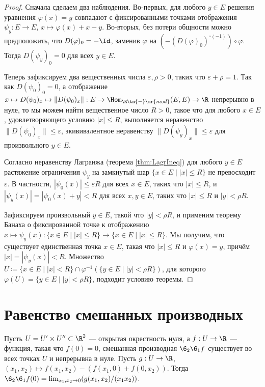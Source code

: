 \documentclass[
	extrafontsizes,
	11pt,
	hyphens,
]{memoir}
\begin{document}
\begin{proof}
Сначала сделаем два наблюдения.
Во-первых, для любого \(y \in E\) решения уравнения \(\varphi(x) = y\) совпадают с фиксированными точками отображения \(\psi_y : E \to E\), \(x \mapsto \varphi(x) + x - y\).
Во-вторых,
без потери общности
можно предположить, что
\(D(\varphi)_0 = -\Id\),
заменив \(\varphi\) на \((-(D(\varphi)_0)^{\circ(-1)}) \circ \varphi\).
Тогда \(D(\psi_y)_0 = 0\) для всех \(y \in E\).

Теперь зафиксируем два вещественных числа
\(\varepsilon, \rho > 0\), таких что \(\varepsilon + \rho = 1\).
Так как \(D(\psi_0)_0 = 0\),
а отображение
\(x \mapsto D(\psi_0)_x \mapsto \lVert D(\psi_0)_x \rVert : E \to \Hom_{\R\tn{-}\mr{mod}}(E,E) \to \R\)
непрерывно в нуле, то 
мы можем найти вещественное число \(R > 0\), такое что
для любого \(x \in E\), удовлетворяющего условию \(|x| \leq R\), выполняется неравенство \(\lVert D(\psi_0)_x \rVert \leq \varepsilon\),
экививалентное неравенству \(\lVert D(\psi_y)_x \rVert \leq \varepsilon\) для произвольного \(y \in E\).

Согласно неравенству Лагранжа (теорема \ref{thm:LagrIneq})
для любого \(y \in E\)
растяжение ограничения \(\psi_y\)
на замкнутый шар \(\{x \in E \mid |x| \leq R\}\)
не превосходит \(\varepsilon\).
В частности, \(|\psi_0(x)| \leq \varepsilon R\) для всех \(x \in E\), таких что \(|x| \leq R\),
и \(|\psi_y(x)| = |\psi_0(x) + y| < R\)
для всех \(x,y \in E\), таких что \(|x| \leq R\)
и \(|y| < \rho R\).

Зафиксируем произвольный \(y \in E\), такой что \(|y| < \rho R\), и применим теорему Банаха о фиксированной точке к
отображению \(x \mapsto \psi_y(x) : \{x \in E \mid |x| \leq R\} \to \{x \in E \mid |x| \leq R\}\).
Мы получим, что существует единственная точка \(x \in E\), такая что \(|x| \leq R\) и \(\varphi(x) = y\),
причём \(|x| = |\psi_y(x)| < R\).
Множество
\(U \coloneqq \{x \in E \mid |x| < R\} \cap \varphi^{-1}(\{y \in E \mid |y| < \rho R\})\),
для которого \(\varphi(U) = \{y \in E \mid |y| < \rho R\}\),
подходит условию теоремы.
\end{proof}


\section{Равенство смешанных производных}

\begin{theorem}
Пусть \(U = U' \times U'' \subset \R^2\) --- открытая окрестность нуля, а \(f : U \to \R\) --- функция, такая что
\(f(0) = 0\),
смешанная производная
\(\6_2 \6_1 f\)
существует во всех точках \(U\) и непрерывна в нуле.
Пусть \(g : U \to \R\), \((x_1,x_2) \mapsto f(x_1,x_2) - (f(x_1,0) + f(0,x_2))\).
Тогда
\(
\6_2 \6_1 f(0) =
\lim_{x_1,x_2 \to 0} (g(x_1,x_2)/(x_1 x_2))
\).
\end{theorem}
\end{document}
